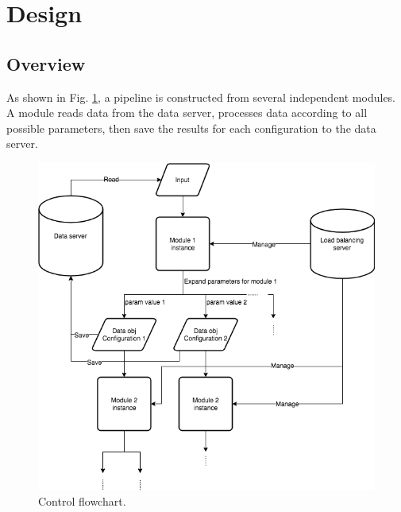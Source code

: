 \documentclass{article}
\begin{document}
\section{Design}

    \subsection{Overview}

    As shown in Fig. \ref{fig:control_flow},
    a pipeline is constructed from several independent modules.
    A module reads data from the data server,
    processes data according to all possible parameters,
    then save the results for each configuration to the data server.

    \begin{figure}[h]
        \begin{center}
            \includegraphics[width=\textwidth]{fig/control_flow.png}
        \end{center}
        \caption{Control flowchart.}\label{fig:control_flow}
    \end{figure}
\end{document}
